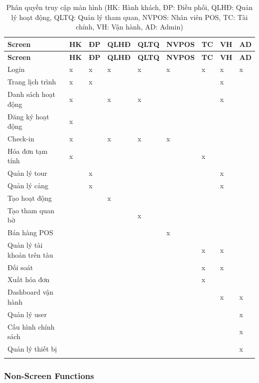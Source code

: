 \begin{longtable}{|p{3.3cm}|p{1cm}|p{1cm}|p{1.3cm}|p{1.3cm}|p{0.9cm}|p{1.1cm}|p{1.1cm}|p{0.9cm}|}
    \hline
    \textbf{Screen} & \textbf{HK} & \textbf{ĐP} & \textbf{QLHĐ} & \textbf{QLTQ}
    & \textbf{NVPOS} & \textbf{TC} & \textbf{VH} & \textbf{AD} \\
    \hline
    \endfirsthead
    \hline
    \textbf{Screen} & \textbf{HK} & \textbf{ĐP} & \textbf{QLHĐ} & \textbf{QLTQ}
    & \textbf{NVPOS} & \textbf{TC} & \textbf{VH} & \textbf{AD} \\
    \hline
    \endhead
    Login & x & x & x & x & x & x & x & x \\ \hline
    Trang lịch trình & x & x & & & & & x & \\ \hline
    Danh sách hoạt động & x & & x & x & & & x & \\ \hline
    Đăng ký hoạt động & x & & & & & & & \\ \hline
    Check-in & x & & x & x & x & & & \\ \hline
    Hóa đơn tạm tính & x & & & & & x & & \\ \hline
    Quản lý tour & & x & & & & & x & \\ \hline
    Quản lý cảng & & x & & & & & x & \\ \hline
    Tạo hoạt động & & & x & & & & & \\ \hline
    Tạo tham quan bờ & & & & x & & & & \\ \hline
    Bán hàng POS & & & & & x & & & \\ \hline
    Quản lý tài khoản trên tàu & & & & & & x & x & \\ \hline
    Đối soát & & & & & & x & x & \\ \hline
    Xuất hóa đơn & & & & & & x & & \\ \hline
    Dashboard vận hành & & & & & & & x & x \\ \hline
    Quản lý user & & & & & & & & x \\ \hline
    Cấu hình chính sách & & & & & & & & x \\ \hline
    Quản lý thiết bị & & & & & & & & x \\ \hline
    \caption{Phân quyền truy cập màn hình (HK: Hành khách, ĐP: Điều phối,
    QLHĐ: Quản lý hoạt động, QLTQ: Quản lý tham quan, NVPOS: Nhân viên
    POS, TC: Tài chính, VH: Vận hành, AD: Admin)}
    \label{tab:screen-authorization}
\end{longtable}

\subsubsection{Non-Screen Functions}

